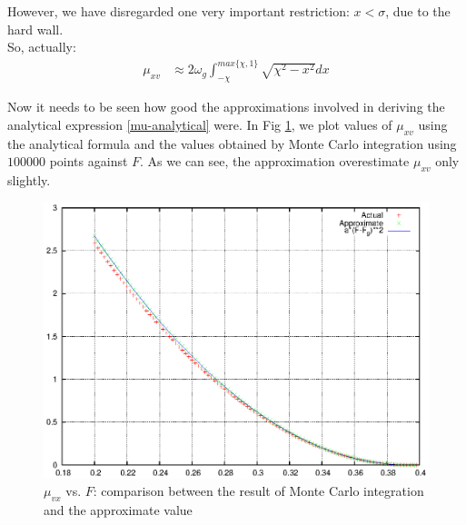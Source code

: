 \documentclass{book}
\renewcommand{\(}{\begin{columns}}
\renewcommand{\)}{\end{columns}}
\newcommand{\<}[1]{\begin{column}{#1}}
\renewcommand{\>}{\end{column}}
\begin{document}
However, we have disregarded one very important restriction: $x<\sigma$, due to 
the hard wall.  \\

So, actually:
\begin{align}
\label{mu-analytical}
\mu_{xv}&\approx2\omega_g\int_{-\chi}^{max\{\chi,1\}} \sqrt{\chi^2-x^2}dx
\end{align}


Now it needs to be seen how good the approximations involved in deriving the 
analytical expression \eqref{mu-analytical} were.  In Fig 
\ref{fig-mu-actual-approx}, we plot values of $\mu_{xv}$ using the analytical formula and the values 
obtained by Monte Carlo integration using $100000$ points against $F$.  As we 
can see, the approximation overestimate $\mu_{xv}$ only slightly.  

\begin{figure}[!htb]
\caption{$\mu_{vx}$ vs.  $F$: comparison between the result of Monte Carlo integration
and the approximate value}
\label{fig-mu-actual-approx}
\begin{center}
\includegraphics[width=0.75\columnwidth]{vxarea-actual-approx}
\end{center}
\end{figure}



%
%
%
%
%
\end{document}
